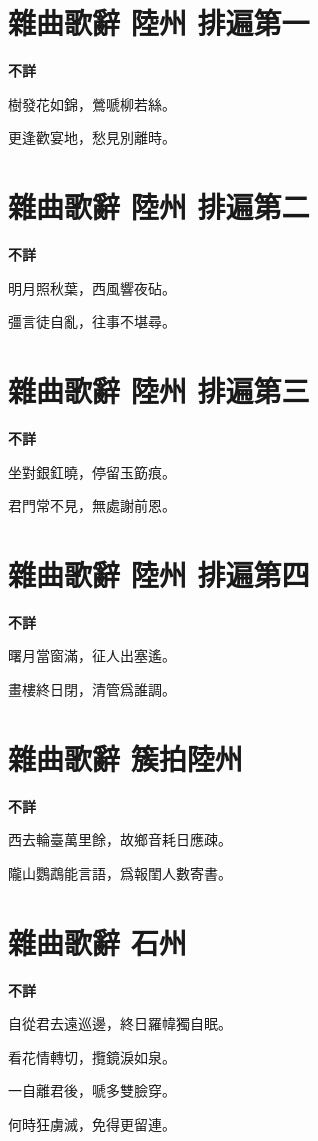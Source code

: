\documentclass[12pt,a4paper]{ctexbook}
\begin{document}
\section{雜曲歌辭 陸州 排遍第一}
\textbf{不詳}\par\vspace{0.5em}
樹發花如錦，鶯嗁柳若絲。\par
更逢歡宴地，愁見別離時。\par

\section{雜曲歌辭 陸州 排遍第二}
\textbf{不詳}\par\vspace{0.5em}
明月照秋葉，西風響夜砧。\par
彊言徒自亂，往事不堪尋。\par

\section{雜曲歌辭 陸州 排遍第三}
\textbf{不詳}\par\vspace{0.5em}
坐對銀釭曉，停留玉筯痕。\par
君門常不見，無處謝前恩。\par

\section{雜曲歌辭 陸州 排遍第四}
\textbf{不詳}\par\vspace{0.5em}
曙月當窗滿，征人出塞遙。\par
畫樓終日閉，清管爲誰調。\par

\section{雜曲歌辭 簇拍陸州}
\textbf{不詳}\par\vspace{0.5em}
西去輪臺萬里餘，故鄉音耗日應疎。\par
隴山鸚鵡能言語，爲報閨人數寄書。\par

\section{雜曲歌辭 石州}
\textbf{不詳}\par\vspace{0.5em}
自從君去遠巡邊，終日羅幃獨自眠。\par
看花情轉切，攬鏡淚如泉。\par
一自離君後，嗁多雙臉穿。\par
何時狂虜滅，免得更留連。\par
\end{document}
